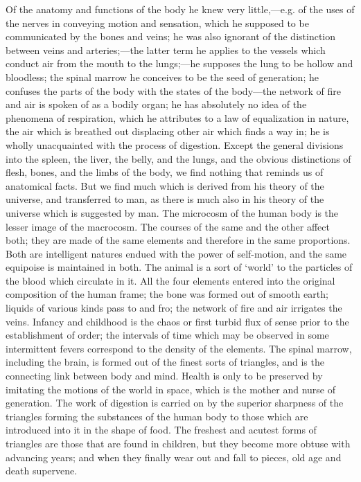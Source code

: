 Of the anatomy and functions of the body he knew very little,—e.g.
of the uses of the nerves in conveying motion and sensation, which he
supposed to be communicated by the bones and veins; he was also ignorant
of the distinction between veins and arteries;—the latter term he
applies to the vessels which conduct air from the mouth to the lungs;—he
supposes the lung to be hollow and bloodless; the spinal marrow he
conceives to be the seed of generation; he confuses the parts of the body
with the states of the body—the network of fire and air is spoken of
as a bodily organ; he has absolutely no idea of the phenomena of
respiration, which he attributes to a law of equalization in nature, the
air which is breathed out displacing other air which finds a way in; he is
wholly unacquainted with the process of digestion. Except the general
divisions into the spleen, the liver, the belly, and the lungs, and the
obvious distinctions of flesh, bones, and the limbs of the body, we find
nothing that reminds us of anatomical facts. But we find much which is
derived from his theory of the universe, and transferred to man, as there
is much also in his theory of the universe which is suggested by man. The
microcosm of the human body is the lesser image of the macrocosm. The
courses of the same and the other affect both; they are made of the same
elements and therefore in the same proportions. Both are intelligent
natures endued with the power of self-motion, and the same equipoise is
maintained in both. The animal is a sort of ‘world’ to the particles of
the blood which circulate in it. All the four elements entered into the
original composition of the human frame; the bone was formed out of smooth
earth; liquids of various kinds pass to and fro; the network of fire and
air irrigates the veins. Infancy and childhood is the chaos or first
turbid flux of sense prior to the establishment of order; the intervals of
time which may be observed in some intermittent fevers correspond to the
density of the elements. The spinal marrow, including the brain, is formed
out of the finest sorts of triangles, and is the connecting link between
body and mind. Health is only to be preserved by imitating the motions of
the world in space, which is the mother and nurse of generation. The work
of digestion is carried on by the superior sharpness of the triangles
forming the substances of the human body to those which are introduced
into it in the shape of food. The freshest and acutest forms of triangles
are those that are found in children, but they become more obtuse with
advancing years; and when they finally wear out and fall to pieces, old
age and death supervene.

